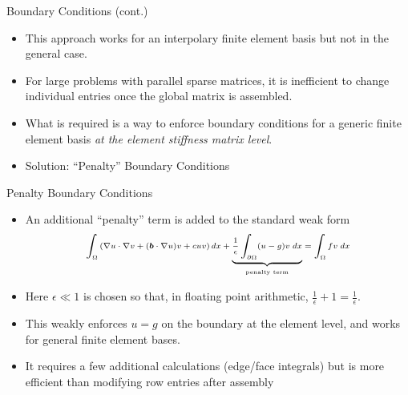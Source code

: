 \begin{frame}{Boundary Conditions (cont.)}
  \begin{itemize}
    \item This approach works for an interpolary finite element basis
      but not in the general case.

    \item For large problems with parallel sparse matrices, it
      is inefficient to change individual entries once the global matrix is assembled.

    \item What is required is a way to enforce boundary conditions for
      a generic finite element basis \emph{at the element stiffness matrix level}.

    \item Solution: ``Penalty'' Boundary Conditions
  \end{itemize}
\end{frame}


\begin{frame}{Penalty Boundary Conditions}
  \begin{itemize}
  \item An additional ``penalty'' term is added to the standard weak form
    \begin{equation}
      \nonumber
      \scriptsize
      \int_{\Omega} \left( \nabla u \cdot \nabla v + ({\boldsymbol{b}} \cdot \nabla u) v + cuv \right) dx
      + \underbrace{\frac{1}{\epsilon} \int_{\partial \Omega} (u-g)v \; dx}_{\text{penalty term}} =
      \int_{\Omega} fv \; dx
    \end{equation}

  \item Here $\epsilon \ll 1$ is chosen so that, in floating point arithmetic,
    $\frac{1}{\epsilon} + 1 = \frac{1}{\epsilon}$.

  \item This weakly enforces $u=g$ on the boundary at the element level, and works for
    general finite element bases.

  \item It requires a few additional calculations (edge/face integrals) but is more
    efficient than modifying row entries after assembly
  \end{itemize}
\end{frame}





